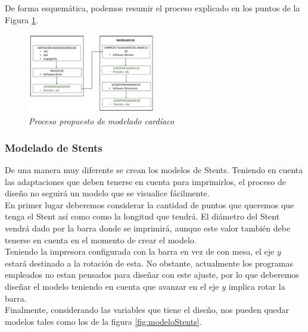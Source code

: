 \documentclass[a4paper,12pt]{article}
\begin{document}
De forma esquemática, podemos resumir el proceso explicado en los puntos de la Figura \ref{modeloCardio}.\\

	\begin{figure}[!ht]
	\begin{center}
	  \includegraphics[width=0.5\textwidth]{Figuras/modeloCardio.png}
	  \caption{\emph{Proceso propuesto de modelado cardíaco}}
	\end{center}
	\label{modeloCardio}
	\end{figure}

\subsubsection{Modelado de Stents}
De una manera muy diferente se crean los modelos de Stents. Teniendo en cuenta las adaptaciones que deben tenerse en cuenta para imprimirlos, el proceso de diseño no seguirá un modelo que se visualice fácilmente.\\

En primer lugar deberemos considerar la cantidad de puntos que queremos que tenga el Stent así como como la longitud que tendrá. El diámetro del Stent vendrá dado por la barra donde se imprimirá, aunque este valor también debe tenerse en cuenta en el momento de crear el modelo.\\

Teniendo la impresora configurada con la barra en vez de con mesa, el eje $y$ estará destinado a la rotación de esta. No obstante, actualmente los programas empleados no estan pensados para diseñar con este ajuste, por lo que deberemos diseñar el modelo teniendo en cuenta que avanzar en el eje $y$ implica rotar la barra.\\

Finalmente, considerando las variables que tiene el diseño, nos pueden quedar modelos tales como los de la figura \ref{fig:modeloStents}.
\end{document}
